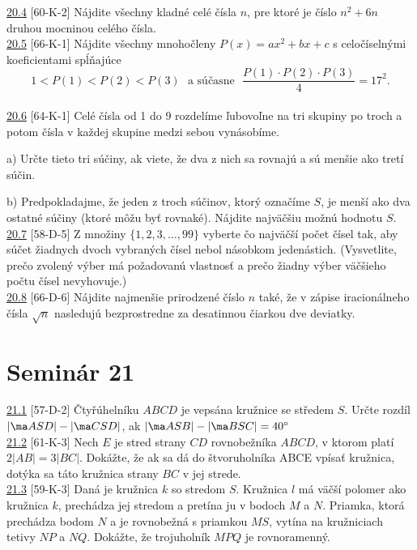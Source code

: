 \noindent \ul{20.4} [60-K-2]
Nájdite všechny kladné celé čísla $n$, pre ktoré je číslo $n^2 + 6n$ druhou mocninou celého čísla.\\

\noindent \ul{20.5} [66-K-1] Nájdite všechny mnohočleny $P(x) = ax^2 +bx+c$ s celočíselnými koeficientami spĺňajúce
$$1 < P(1) < P(2) < P(3) \ \ \ \text{a súčasne} \ \  \
\frac{P(1) \cdot P(2) \cdot P(3)}{4}= 17^2.$$\\

\noindent \ul{20.6} [64-K-1]
Celé čísla od 1 do 9 rozdelíme ľubovoľne na tri skupiny po troch a potom čísla v každej skupine medzi sebou vynásobíme.

a) Určte tieto tri súčiny, ak viete, že dva z nich sa rovnajú a sú menšie ako tretí súčin.

b) Predpokladajme, že jeden z troch súčinov, ktorý označíme $S$, je menší ako dva ostatné súčiny (ktoré môžu byť rovnaké). Nájdite najväčšiu možnú hodnotu $S$.\\

\noindent \ul{20.7} [58-D-5] Z množiny $\{1, 2, 3, \ldots, 99\}$ vyberte čo najväčší počet čísel tak, aby súčet žiadnych dvoch vybraných čísel nebol násobkom jedenástich. (Vysvetlite, prečo zvolený výber má požadovanú vlastnosť a prečo žiadny výber väčšieho počtu čísel nevyhovuje.)\\

\noindent \ul{20.8} [66-D-6]
Nájdite najmenšie prirodzené číslo $n$ také, že v zápise iracionálneho čísla $\sqrt{n}$ nasledujú bezprostredne za desatinnou čiarkou dve deviatky.\\

\section*{Seminár 21}

\noindent \ul{21.1} [57-D-2] Čtyřúhelníku $ABCD$ je vepsána kružnice se středem $S$. Určte rozdíl
$|\ma ASD|- |\ma CSD|$, ak $|\ma ASB| - |\ma BSC| = 40^\circ$\\

\noindent \ul{21.2} [61-K-3] Nech $E$ je stred strany $CD$ rovnobežníka $ABCD$, v ktorom platí $2|AB| = 3|BC|$. Dokážte, že ak sa dá do štvoruholníka ABCE vpísať kružnica, dotýka sa táto kružnica strany $BC$ v jej strede.\\

\noindent \ul{21.3} [59-K-3]  Daná je kružnica $k$ so stredom $S$. Kružnica $l$ má väčší polomer ako kružnica $k$, prechádza jej stredom a pretína ju v bodoch $M$ a $N$. Priamka, ktorá prechádza bodom $N$ a je rovnobežná s priamkou $MS$, vytína na kružniciach tetivy $NP$ a $NQ$. Dokážte, že trojuholník $MPQ$ je rovnoramenný.\\

